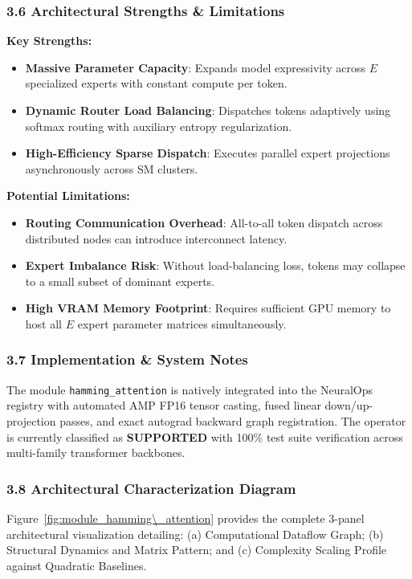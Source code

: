 \subsubsection*{3.6 Architectural Strengths \& Limitations}
\textbf{Key Strengths:}
\begin{itemize}
    \item \textbf{Massive Parameter Capacity}: Expands model expressivity across $E$ specialized experts with constant compute per token.
    \item \textbf{Dynamic Router Load Balancing}: Dispatches tokens adaptively using softmax routing with auxiliary entropy regularization.
    \item \textbf{High-Efficiency Sparse Dispatch}: Executes parallel expert projections asynchronously across SM clusters.
\end{itemize}

\textbf{Potential Limitations:}
\begin{itemize}
    \item \textbf{Routing Communication Overhead}: All-to-all token dispatch across distributed nodes can introduce interconnect latency.
    \item \textbf{Expert Imbalance Risk}: Without load-balancing loss, tokens may collapse to a small subset of dominant experts.
    \item \textbf{High VRAM Memory Footprint}: Requires sufficient GPU memory to host all $E$ expert parameter matrices simultaneously.
\end{itemize}

\subsubsection*{3.7 Implementation \& System Notes}
The module \texttt{hamming\_attention} is natively integrated into the NeuralOps registry with automated AMP FP16 tensor casting, fused linear down/up-projection passes, and exact autograd backward graph registration. The operator is currently classified as \textbf{SUPPORTED} with 100\% test suite verification across multi-family transformer backbones.

\subsubsection*{3.8 Architectural Characterization Diagram}
Figure~\ref{fig:module_hamming\_attention} provides the complete 3-panel architectural visualization detailing: (a) Computational Dataflow Graph; (b) Structural Dynamics and Matrix Pattern; and (c) Complexity Scaling Profile against Quadratic Baselines.

